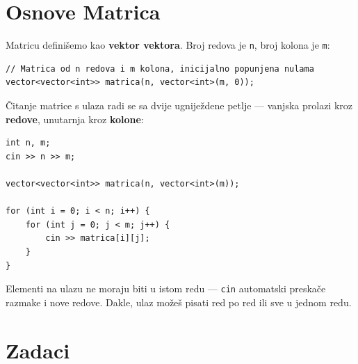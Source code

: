 \documentclass[11pt]{article}
\begin{document}
\section*{Osnove Matrica}

Matricu definišemo kao \textbf{vektor vektora}. Broj redova je \texttt{n},
broj kolona je \texttt{m}:

\begin{lstlisting}
// Matrica od n redova i m kolona, inicijalno popunjena nulama
vector<vector<int>> matrica(n, vector<int>(m, 0));
\end{lstlisting}

\medskip
Čitanje matrice s ulaza radi se sa dvije ugniježdene petlje —
vanjska prolazi kroz \textbf{redove}, unutarnja kroz \textbf{kolone}:

\begin{lstlisting}
int n, m;
cin >> n >> m;

vector<vector<int>> matrica(n, vector<int>(m));

for (int i = 0; i < n; i++) {
    for (int j = 0; j < m; j++) {
        cin >> matrica[i][j];
    }
}
\end{lstlisting}

\begin{napomena}
    Elementi na ulazu ne moraju biti u istom redu — \texttt{cin} automatski
    preskače razmake i nove redove. Dakle, ulaz možeš pisati red po red ili
    sve u jednom redu.
\end{napomena}

\section*{Zadaci}
\end{document}
